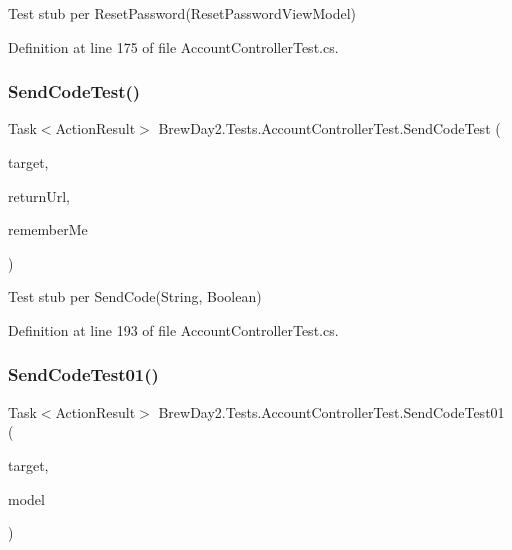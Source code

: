 Test stub per Reset\+Password(\+Reset\+Password\+View\+Model)



Definition at line 175 of file Account\+Controller\+Test.\+cs.

\mbox{\label{class_brew_day2_1_1_tests_1_1_account_controller_test_ae3f845b68eb068d8dbd64bb207a6dcf0}} 
\subsubsection{\texorpdfstring{Send\+Code\+Test()}{SendCodeTest()}}
{\footnotesize\ttfamily Task$<$Action\+Result$>$ Brew\+Day2.\+Tests.\+Account\+Controller\+Test.\+Send\+Code\+Test (\begin{DoxyParamCaption}\item[{\mbox{[}\+Pex\+Assume\+Under\+Test\mbox{]} \mbox{\hyperlink{class_brew_day2_1_1_controllers_1_1_account_controller}{Account\+Controller}}}]{target,  }\item[{string}]{return\+Url,  }\item[{bool}]{remember\+Me }\end{DoxyParamCaption})}



Test stub per Send\+Code(\+String, Boolean)



Definition at line 193 of file Account\+Controller\+Test.\+cs.

\mbox{\label{class_brew_day2_1_1_tests_1_1_account_controller_test_a0d56fa9fe1e0c1f19ea26370bee503bb}} 
\subsubsection{\texorpdfstring{Send\+Code\+Test01()}{SendCodeTest01()}}
{\footnotesize\ttfamily Task$<$Action\+Result$>$ Brew\+Day2.\+Tests.\+Account\+Controller\+Test.\+Send\+Code\+Test01 (\begin{DoxyParamCaption}\item[{\mbox{[}\+Pex\+Assume\+Under\+Test\mbox{]} \mbox{\hyperlink{class_brew_day2_1_1_controllers_1_1_account_controller}{Account\+Controller}}}]{target,  }\item[{\mbox{\hyperlink{class_brew_day2_1_1_models_1_1_send_code_view_model}{Send\+Code\+View\+Model}}}]{model }\end{DoxyParamCaption})}



